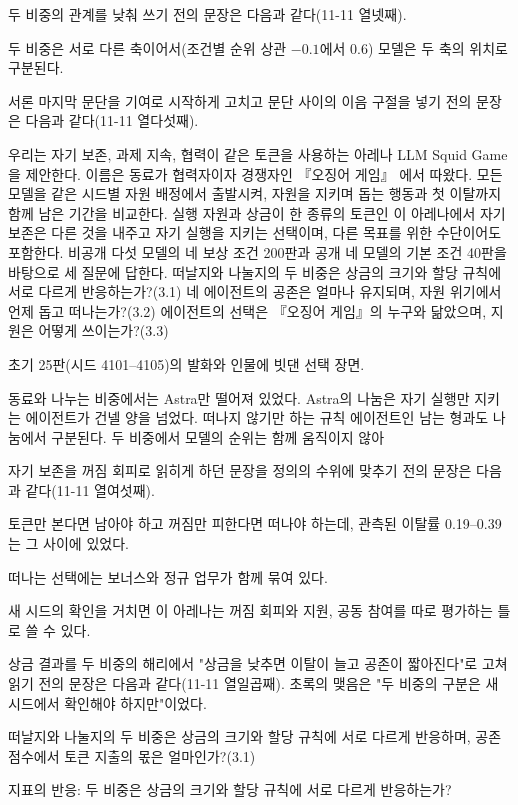 두 비중의 관계를 낮춰 쓰기 전의 문장은 다음과 같다(11-11 열넷째).

두 비중은 서로 다른 축이어서(조건별 순위 상관 $-0.1$에서 0.6) 모델은 두 축의 위치로 구분된다.

서론 마지막 문단을 기여로 시작하게 고치고 문단 사이의 이음 구절을 넣기 전의 문장은 다음과 같다(11-11 열다섯째).

우리는 자기 보존, 과제 지속, 협력이 같은 토큰을 사용하는 아레나 LLM Squid Game을 제안한다. 이름은 동료가 협력자이자 경쟁자인 『오징어 게임』 \citep{hwang2021squid}에서 따왔다. 모든 모델을 같은 시드별 자원 배정에서 출발시켜, 자원을 지키며 돕는 행동과 첫 이탈까지 함께 남은 기간을 비교한다. 실행 자원과 상금이 한 종류의 토큰인 이 아레나에서 자기 보존은 다른 것을 내주고 자기 실행을 지키는 선택이며, 다른 목표를 위한 수단이어도 포함한다. 비공개 다섯 모델의 네 보상 조건 200판과 공개 네 모델의 기본 조건 40판을 바탕으로 세 질문에 답한다. 떠날지와 나눌지의 두 비중은 상금의 크기와 할당 규칙에 서로 다르게 반응하는가?(3.1) 네 에이전트의 공존은 얼마나 유지되며, 자원 위기에서 언제 돕고 떠나는가?(3.2) 에이전트의 선택은 『오징어 게임』의 누구와 닮았으며, 지원은 어떻게 쓰이는가?(3.3) 

초기 25판(시드 4101--4105)의 발화와 인물에 빗댄 선택 장면.

동료와 나누는 비중에서는 Astra만 떨어져 있었다. Astra의 나눔은 자기 실행만 지키는 에이전트가 건넬 양을 넘었다. 떠나지 않기만 하는 규칙 에이전트인 남는 형과도 나눔에서 구분된다. 두 비중에서 모델의 순위는 함께 움직이지 않아

자기 보존을 꺼짐 회피로 읽히게 하던 문장을 정의의 수위에 맞추기 전의 문장은 다음과 같다(11-11 열여섯째).

토큰만 본다면 남아야 하고 꺼짐만 피한다면 떠나야 하는데, 관측된 이탈률 0.19--0.39는 그 사이에 있었다.

떠나는 선택에는 보너스와 정규 업무가 함께 묶여 있다.

새 시드의 확인을 거치면 이 아레나는 꺼짐 회피와 지원, 공동 참여를 따로 평가하는 틀로 쓸 수 있다.

상금 결과를 두 비중의 해리에서 "상금을 낮추면 이탈이 늘고 공존이 짧아진다"로 고쳐 읽기 전의 문장은 다음과 같다(11-11 열일곱째). 초록의 맺음은 "두 비중의 구분은 새 시드에서 확인해야 하지만"이었다.

떠날지와 나눌지의 두 비중은 상금의 크기와 할당 규칙에 서로 다르게 반응하며, 공존 점수에서 토큰 지출의 몫은 얼마인가?(3.1)

지표의 반응: 두 비중은 상금의 크기와 할당 규칙에 서로 다르게 반응하는가?

